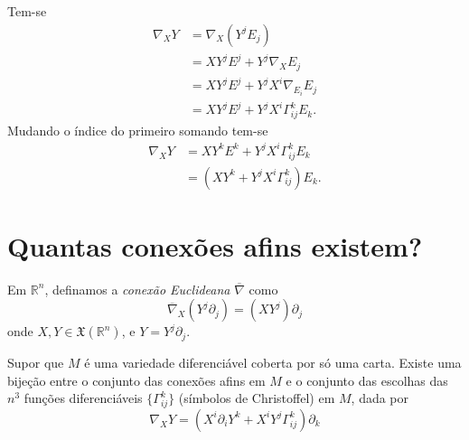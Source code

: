 \begin{demonstracao}
	Tem-se
	\begin{align*}
		\nabla_X Y &= \nabla_X (Y^j E_j)\\
		&= X Y^j E^j + Y^j \nabla_X E_j\\
		&= X Y^j E^j + Y^j X^i \nabla_{E_i} E_j\\
		&= X Y^j E^j + Y^j X^i \Gamma^k_{ij} E_k.
	\end{align*}
	Mudando o índice do primeiro somando tem-se
	\begin{align*}
		\nabla_X Y &= X Y^k E^k + Y^j X^i \Gamma^k_{ij} E_k\\
		&= (X Y^k + Y^j X^i \Gamma^k_{ij}) E_k.
	\end{align*}
\end{demonstracao}

\section{Quantas conexões afins existem?}

\begin{definicao}
	Em $\mathbb{R}^n$, definamos a \emph{conexão Euclideana} $\overline{\nabla}$ como
	\begin{equation*}
		\overline{\nabla}_X \left( Y^j \partial_j \right) = (X Y^j) \partial_j
	\end{equation*}
	onde $X,Y \in \mathfrak{X}(\mathbb{R}^n)$, e $Y = Y^j \partial_j$.
\end{definicao}

\begin{lema}
	Supor que $M$ é uma variedade diferenciável coberta por só uma carta. Existe uma bijeção entre o conjunto das conexões afins em $M$ e o conjunto das escolhas das $n^3$ funções diferenciáveis $\{ \Gamma^k_{ij} \}$ (símbolos de Christoffel) em $M$, dada por
	\begin{equation*}
		\nabla_X Y = \left( X^i \partial_i Y^k + X^i Y^j \Gamma^k_{ij} \right) \partial_k
	\end{equation*}
\end{lema}

